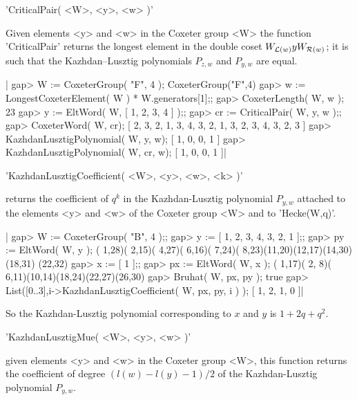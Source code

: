 
'CriticalPair( <W>, <y>, <w> )'

Given  elements  <y>  and  <w>  in  the  Coxeter  group  <W>  the  function
'CriticalPair'  returns the longest  element in the  double coset $W_{{\cal
L}(w)}y  W_{{\cal R}(w)}$; it is such that the Kazhdan--Lusztig polynomials
$P_{z,w}$ and $P_{y,w}$ are equal.

|    gap> W := CoxeterGroup( "F", 4 );
    CoxeterGroup("F",4)
    gap> w := LongestCoxeterElement( W ) * W.generators[1];;
    gap> CoxeterLength( W, w );
    23
    gap> y := EltWord( W, [ 1, 2, 3, 4 ] );;
    gap> cr := CriticalPair( W, y, w );;
    gap> CoxeterWord( W, cr);
    [ 2, 3, 2, 1, 3, 4, 3, 2, 1, 3, 2, 3, 4, 3, 2, 3 ]
    gap> KazhdanLusztigPolynomial( W, y, w);
    [ 1, 0, 0, 1 ]
    gap> KazhdanLusztigPolynomial( W, cr, w);
    [ 1, 0, 0, 1 ]|


'KazhdanLusztigCoefficient( <W>, <y>, <w>, <k> )'

returns   the  coefficient  of  $q^k$  in  the  Kazhdan-Lusztig  polynomial
$P_{y,w}$ attached to the elements <y> and <w> of the Coxeter group <W> and
to 'Hecke(W,q)'.

|    gap> W := CoxeterGroup( "B", 4 );;
    gap> y := [ 1, 2, 3, 4, 3, 2, 1 ];;
    gap> py := EltWord( W, y );
    ( 1,28)( 2,15)( 4,27)( 6,16)( 7,24)( 8,23)(11,20)(12,17)(14,30)(18,31)
    (22,32)
    gap> x := [ 1 ];;
    gap> px := EltWord( W, x );
    ( 1,17)( 2, 8)( 6,11)(10,14)(18,24)(22,27)(26,30)
    gap> Bruhat( W, px, py );
    true
    gap> List([0..3],i->KazhdanLusztigCoefficient( W, px, py, i ) );
    [ 1, 2, 1, 0 ]|

So  the  Kazhdan-Lusztig polynomial  corresponding  to  $x$  and  $y$  is
$1+2q+q^2$.


'KazhdanLusztigMue( <W>, <y>, <w> )'

given  elements <y> and <w> in the Coxeter group <W>, this function returns
the   coefficient  of  degree   $(l(w)-l(y)-1)/2$  of  the  Kazhdan-Lusztig
polynomial $P_{y,w}$.

